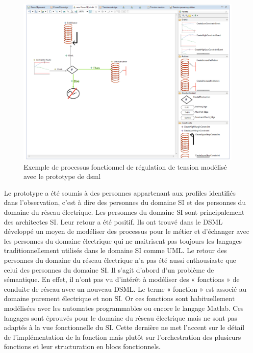 \begin{figure}[!ht]
 \begin{center}
  \includegraphics[trim = 0cm 0cm 0cm 0cm, width=1\textwidth]{figures/6_methodologie/proto_dsml.pdf}
 \end{center}
 \caption{Exemple de processus fonctionnel de régulation de tension modélisé avec le prototype de \gls{dsml}}
 \label{fig:proto_dsml}
\end{figure} 

Le prototype a été soumis à des personnes appartenant aux profiles identifiés
dans l'observation, c'est à dire des personnes du domaine SI et des personnes du
domaine du réseau électrique. Les personnes du domaine SI sont principalement
des architectes SI. Leur retour a été positif. Ils ont trouvé dans le DSML
développé un moyen de modéliser des processus pour le métier et d'échanger avec
les personnes du domaine électrique qui ne maitrisent pas toujours les langages
traditionnellement utilisés dans le domaine SI comme UML. Le retour des
personnes du domaine du réseau électrique n'a pas été aussi enthousiaste que
celui des personnes du domaine SI. Il s'agit d'abord d'un problème de
sémantique. En effet, il n'ont pas vu d'intérêt à modéliser des « fonctions » de
conduite de réseau avec un nouveau DSML. Le terme « fonction » est associé au
domaine purement électrique et non SI. Or ces fonctions sont habituellement
modélisées avec les automates programmables ou encore le langage Matlab. Ces
langages sont éprouvés pour le domaine du réseau électrique mais ne sont pas
adaptés à la vue fonctionnelle du SI. Cette dernière ne met l'accent sur le
détail de l'implémentation de la fonction mais plutôt sur l'orchestration des
plusieurs fonctions et leur structuration en blocs fonctionnels.

